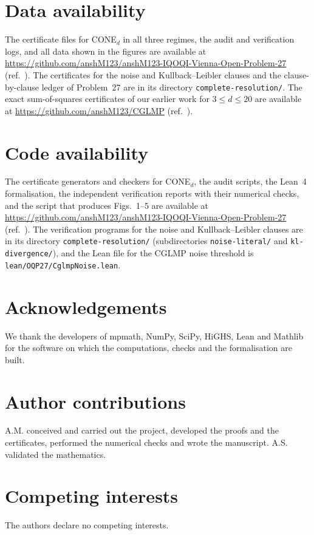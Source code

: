 \documentclass[11pt]{article}
\begin{document}
\section*{Data availability}
The certificate files for CONE$_d$ in all three regimes, the audit and verification logs, and all data shown in the
figures are available at \url{https://github.com/anshM123/anshM123-IQOQI-Vienna-Open-Problem-27} (ref.~).
The certificates for the noise and Kullback--Leibler clauses and the clause-by-clause ledger of Problem~27 are in its
directory \texttt{complete-resolution/}.
The exact sum-of-squares certificates of our earlier work for $3\le d\le20$ are available at
\url{https://github.com/anshM123/CGLMP} (ref.~).

\section*{Code availability}
The certificate generators and checkers for CONE$_d$, the audit scripts, the Lean~4 formalisation, the independent
verification reports with their numerical checks, and the script that produces Figs.~1--5 are available at
\url{https://github.com/anshM123/anshM123-IQOQI-Vienna-Open-Problem-27} (ref.~). The verification
programs for the noise and Kullback--Leibler clauses are in its directory \texttt{complete-resolution/} (subdirectories
\texttt{noise-literal/} and \texttt{kl-divergence/}), and the Lean file for the CGLMP noise threshold is
\texttt{lean/OQP27/CglmpNoise.lean}.


{\small\singlespacing

}

\section*{Acknowledgements}
We thank the developers of mpmath, NumPy, SciPy, HiGHS, Lean and Mathlib for the software on which the computations,
checks and the formalisation are built.

\section*{Author contributions}
A.M. conceived and carried out the project, developed the proofs and the certificates, performed the numerical checks
and wrote the manuscript. A.S. validated the mathematics.

\section*{Competing interests}
The authors declare no competing interests.
\end{document}
